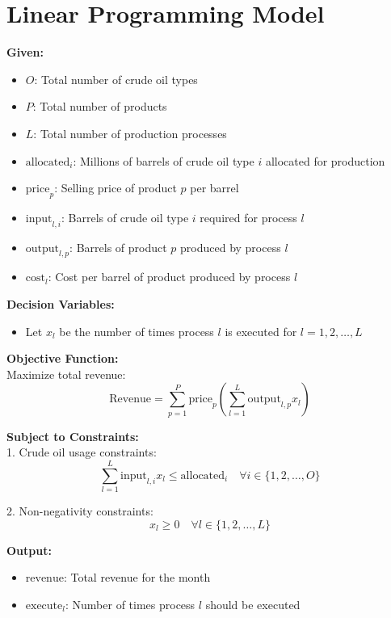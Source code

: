 \documentclass{article}
\begin{document}
\section*{Linear Programming Model}

\textbf{Given:}
\begin{itemize}
    \item \( O \): Total number of crude oil types
    \item \( P \): Total number of products
    \item \( L \): Total number of production processes
    \item \( \text{allocated}_i \): Millions of barrels of crude oil type \( i \) allocated for production
    \item \( \text{price}_p \): Selling price of product \( p \) per barrel
    \item \( \text{input}_{l,i} \): Barrels of crude oil type \( i \) required for process \( l \)
    \item \( \text{output}_{l,p} \): Barrels of product \( p \) produced by process \( l \)
    \item \( \text{cost}_l \): Cost per barrel of product produced by process \( l \)
\end{itemize}

\textbf{Decision Variables:}
\begin{itemize}
    \item Let \( x_l \) be the number of times process \( l \) is executed for \( l = 1, 2, \ldots, L \)
\end{itemize}

\textbf{Objective Function:}\\
Maximize total revenue:
\[
\text{Revenue} = \sum_{p=1}^{P} \text{price}_p \left( \sum_{l=1}^{L} \text{output}_{l,p} x_l \right)
\]

\textbf{Subject to Constraints:}\\
1. Crude oil usage constraints:
\[
\sum_{l=1}^{L} \text{input}_{l,i} x_l \leq \text{allocated}_i \quad \forall i \in \{1, 2, \ldots, O\}
\]

2. Non-negativity constraints:
\[
x_l \geq 0 \quad \forall l \in \{1, 2, \ldots, L\}
\]

\textbf{Output:}
\begin{itemize}
    \item \( \text{revenue} \): Total revenue for the month
    \item \( \text{execute}_l \): Number of times process \( l \) should be executed
\end{itemize}
\end{document}

